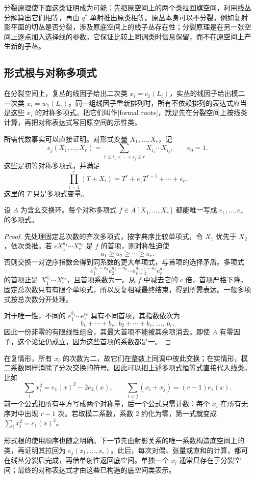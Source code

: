 分裂原理使下面这类证明成为可能：先把原空间上的两个类拉回旗空间，利用线丛分解算出它们相等，再由 \(q^*\) 单射推出原类相等。原丛本身可以不分裂。例如复射影平面的切丛是否分裂，涉及原底空间上的线子丛存在性；分裂原理是在另一张空间上逐点加入选择线的参数。它保证比较上同调类时信息保留，而不在原空间上产生新的子丛。

\subsection{形式根与对称多项式}
\label{g2:subsec:2102:04}
在分裂空间上，复丛的线因子给出二次类 \(x_i=c_1(L_i)\)，实丛的线因子给出模二一次类 \(x_i=w_1(L_i)\)。同一组线因子重新排列时，所有不依赖排列的表达式应当是这些 \(x_i\) 的对称多项式。把它们叫作[formal roots]，就是先在分裂空间上按线类计算，再把对称表达式写回原空间的示性类。

\ProseParagraphBreak

所需代数事实可以直接证明。对形式变量 \(X_1,\ldots,X_r\)，记
\[
	e_j(X_1,\ldots,X_r)=\sum_{1\le i_1<\cdots<i_j\le r}X_{i_1}\cdots X_{i_j},\qquad e_0=1.
\]
这些是初等对称多项式，并满足
\[
	\prod_{i=1}^r(T+X_i)=T^r+e_1T^{r-1}+\cdots+e_r.
\]
这里的 \(T\) 只是多项式变量。

\begin{lemma}\label{g2:lem:symmetric-polynomial-roots}
	设 \(A\) 为含幺交换环。每个对称多项式 \(f\in A[X_1,\ldots,X_r]\) 都能唯一写成 \(e_1,\ldots,e_r\) 的多项式。
\end{lemma}
\begin{proof}
	先处理固定总次数的齐次多项式，按字典序比较单项式，令 \(X_1\) 优先于 \(X_2\)，依次类推。若 \(cX_1^{a_1}\cdots X_r^{a_r}\) 是 \(f\) 的首项，则对称性迫使
	\[
		a_1\ge a_2\ge\cdots\ge a_r.
	\]
	否则交换一对逆序指数会得到同系数的更大单项式，与首项的选择矛盾。多项式
	\[
		e_1^{a_1-a_2}e_2^{a_2-a_3}\cdots e_{r-1}^{a_{r-1}-a_r}e_r^{a_r}
	\]
	的首项正是 \(X_1^{a_1}\cdots X_r^{a_r}\)，且首项系数为一。从 \(f\) 中减去它的 \(c\) 倍，首项严格下降。固定总次数只有有限个单项式，所以反复相减最终结束，得到所需表达。一般多项式按总次数分开处理。

	对于唯一性，不同的 \(e_1^{b_1}\cdots e_r^{b_r}\) 具有不同首项，其指数依次为
	\[
		b_1+\cdots+b_r,\ b_2+\cdots+b_r,\ \ldots,\ b_r.
	\]
	因此一份非零的有限线性组合，其最大首项不能被其余项消去。即使 \(A\) 有零因子，这个论证仍成立，因为这些首项的系数都是一。
\end{proof}

在复情形，所有 \(x_i\) 的次数为二，故它们在整数上同调中彼此交换；在实情形，模二系数同样消除了分次交换的符号。因此可以把上述多项式恒等式直接代入线类。比如
\[
	\sum_i x_i^2=e_1(x)^2-2e_2(x),\qquad
	\sum_{i<j}(x_i+x_j)=(r-1)e_1(x).
\]
前一个公式把所有平方写成两个对称量，后一个公式只需计数：每个 \(x_i\) 在所有无序对中出现 \(r-1\) 次。若取模二系数，系数 \(2\) 约化为零，第一式就变成 \(\sum_i x_i^2=e_1(x)^2\)。

\ProseParagraphBreak

形式根的使用顺序也随之明确。下一节先由射影关系的唯一系数构造底空间上的类，再证明其拉回为 \(e_j(x_1,\ldots,x_r)\)。此后，每次对偶、张量或直和的计算，都可在线丛分裂后完成，再借单射性返回底空间。单独一个 \(x_i\) 通常只存在于分裂空间；最终的对称表达式才由这些已构造的底空间类表示。
